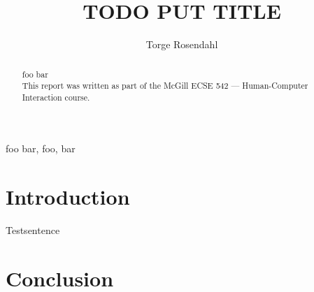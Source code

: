 \documentclass[conference]{IEEEtran}
\title{TODO PUT TITLE}
\author{Torge Rosendahl}
\begin{document}
\maketitle

\begin{abstract}
foo bar
\\
This report was written as part of the McGill ECSE 542 --- Human-Computer Interaction course.
\end{abstract}

\begin{IEEEkeywords}
foo bar, foo, bar
\end{IEEEkeywords}

\section{Introduction}
Testsentence \cite{b1, b2}

\section{Conclusion}





\end{document}
